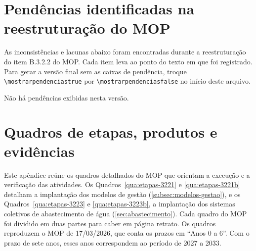 \begin{apendicesenv}
\partapendices

\chapter{Pendências identificadas na reestruturação do MOP}
\label{ap:pendencias}

As inconsistências e lacunas abaixo foram encontradas durante a
reestruturação do item B.3.2.2 do MOP. Cada item leva ao ponto do texto em que
foi registrado. Para gerar a versão final sem as caixas de pendência, troque
\verb|\mostrarpendenciastrue| por \verb|\mostrarpendenciasfalse| no início
deste arquivo.

\ifmostrarpendencias
  \listapendencias
\else
  Não há pendências exibidas nesta versão.
\fi

\chapter{Quadros de etapas, produtos e evidências}
\label{ap:quadros}

Este apêndice reúne os quadros detalhados do MOP que orientam a execução e a
verificação das atividades. Os Quadros~\ref{qua:etapas-3221} e \ref{qua:etapas-3221b} detalham a
implantação dos modelos de gestão (\autoref{subsec:modelos-gestao}), e os
Quadros~\ref{qua:etapas-3223} e \ref{qua:etapas-3223b}, a implantação dos
sistemas coletivos de abastecimento de água (\autoref{sec:abastecimento}).
Cada quadro do MOP foi dividido em duas partes para caber em página retrato. Os quadros reproduzem o
MOP de 17/03/2026, que conta os prazos em ``Anos 0 a 6''. Com o prazo de sete
anos, esses anos correspondem ao período de 2027 a 2033.


\end{apendicesenv}
